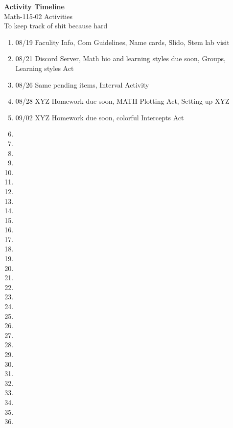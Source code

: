 \documentclass{article}
\begin{document}
\begin{center}
    \Large \textbf{Activity Timeline} \\
    \vspace{0.2cm}
    \normalsize Math-115-02 Activities\\
    \normalsize To keep track of shit because hard
\end{center}
\vspace{1cm} %
\begin{enumerate}[label=\#\arabic*]
    \item 08/19 Faculity Info, Com Guidelines, Name cards, Slido, Stem lab visit
    \item 08/21 Discord Server, Math bio and learning styles due soon, Groups, Learning styles Act 
    \item 08/26 Same pending items, Interval Activity
    \item 08/28 XYZ Homework due soon, MATH Plotting Act, Setting up XYZ
    \item 09/02 XYZ Homework due soon, colorful Intercepts Act
    \item 
    \item
    \item
    \item
    \item
    \item
    \item
    \item
    \item
    \item
    \item
    \item
    \item
    \item
    \item
    \item
    \item
    \item
    \item
    \item
    \item
    \item
    \item
    \item
    \item
    \item
    \item
    \item
    \item
    \item
    \item
\end{enumerate}
\end{document}
